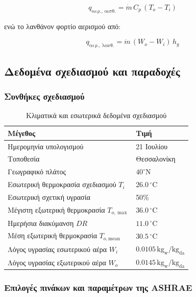 \documentclass[12pt,a4paper]{article}
\begin{document}
\[
q_{\text{αερ., αισθ.}} = \dot{m}\, C_p\, (T_o - T_i)
\]

ενώ το λανθάνον φορτίο αερισμού από:

\[
q_{\text{αερ., λανθ.}} = \dot{m}\, (W_o - W_i)\, h_g
\]

\subsection{Δεδομένα σχεδιασμού και παραδοχές}

\subsubsection{Συνθήκες σχεδιασμού}

\begin{table}[H]
\centering
\caption{Κλιματικά και εσωτερικά δεδομένα σχεδιασμού}
\begin{tabularx}{\textwidth}{L C{3.8cm}}
\toprule
\textbf{Μέγεθος} & \textbf{Τιμή} \\
\midrule
Ημερομηνία υπολογισμού & 21 Ιουλίου \\
Τοποθεσία & Θεσσαλονίκη \\
Γεωγραφικό πλάτος & \(40^\circ \mathrm{N}\) \\
Εσωτερική θερμοκρασία σχεδιασμού \(T_i\) & \(26.0\,^\circ\mathrm{C}\) \\
Εσωτερική σχετική υγρασία & 50\% \\
Μέγιστη εξωτερική θερμοκρασία \(T_{o,\max}\) & \(36.0\,^\circ\mathrm{C}\) \\
Ημερήσια διακύμανση \(DR\) & \(11.0\,^\circ\mathrm{C}\) \\
Μέση εξωτερική θερμοκρασία \(T_{o,\mathrm{mean}}\) & \(30.5\,^\circ\mathrm{C}\) \\
Λόγος υγρασίας εσωτερικού αέρα \(W_i\) & \(0.0105\,\mathrm{kg_w/kg_{da}}\) \\
Λόγος υγρασίας εξωτερικού αέρα \(W_o\) & \(0.0145\,\mathrm{kg_w/kg_{da}}\) \\
\bottomrule
\end{tabularx}
\end{table}

\subsubsection{Επιλογές πινάκων και παραμέτρων της ASHRAE}
\end{document}
